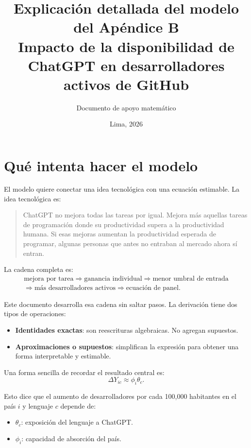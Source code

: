 \documentclass[11pt,a4paper]{article}
\title{\textbf{Explicación detallada del modelo del Apéndice B}\\
\large Impacto de la disponibilidad de ChatGPT en desarrolladores activos de GitHub}
\author{Documento de apoyo matemático}
\date{Lima, 2026}
\begin{document}
\maketitle
\tableofcontents
\newpage

\section{Qué intenta hacer el modelo}

El modelo quiere conectar una idea tecnológica con una ecuación estimable. La idea tecnológica es:

\begin{quote}
ChatGPT no mejora todas las tareas por igual. Mejora más aquellas tareas de programación donde su productividad supera a la productividad humana. Si esas mejoras aumentan la productividad esperada de programar, algunas personas que antes no entraban al mercado ahora sí entran.
\end{quote}

La cadena completa es:
\[
\begin{gathered}
\text{mejora por tarea}
\Longrightarrow
\text{ganancia individual}
\Longrightarrow
\text{menor umbral de entrada}\\
\Longrightarrow
\text{más desarrolladores activos}
\Longrightarrow
\text{ecuación de panel}.
\end{gathered}
\]

Este documento desarrolla esa cadena sin saltar pasos. La derivación tiene dos tipos de operaciones:

\begin{itemize}
  \item \textbf{Identidades exactas}: son reescrituras algebraicas. No agregan supuestos.
  \item \textbf{Aproximaciones o supuestos}: simplifican la expresión para obtener una forma interpretable y estimable.
\end{itemize}

Una forma sencilla de recordar el resultado central es:
\[
\Delta Y_{ic} \approx \phi_i \theta_c.
\]

Esto dice que el aumento de desarrolladores por cada 100,000 habitantes en el país \(i\) y lenguaje \(c\) depende de:

\begin{itemize}
  \item \(\theta_c\): exposición del lenguaje a ChatGPT.
  \item \(\phi_i\): capacidad de absorción del país.
\end{itemize}
\end{document}
